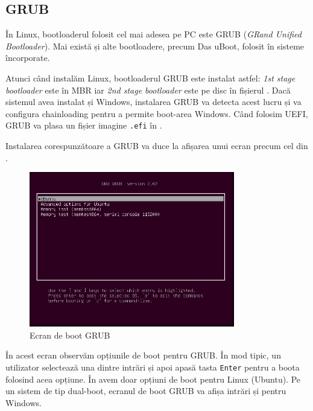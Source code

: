 \subsection{GRUB}
\label{sec:boot:bootloader:grub}

În Linux, bootloaderul folosit cel mai adesea pe PC este GRUB (\textit{GRand Unified
Bootloader}). Mai există și alte bootloadere, precum Das uBoot, folosit în
sisteme încorporate.

Atunci când instalăm Linux, bootloaderul GRUB este instalat astfel: \textit{1st
stage bootloader} este în MBR iar \textit{2nd stage bootloader} este pe disc în fișierul
. Dacă sistemul avea instalat și Windows, instalarea GRUB va
detecta acest lucru și va configura chainloading pentru a permite boot-area
Windows. Când folosim UEFI, GRUB va plasa un fișier imagine \texttt{.efi} în
.

Instalarea corespunzătoare a GRUB va duce la afișarea unui ecran precum cel din .

\begin{figure}[!htbp]
  \centering
  \includegraphics[width=0.8\textwidth]{chapters/09-boot/img/boot-grub.png}
  \caption{Ecran de boot GRUB}
  \label{fig:boot:boot-grub}
\end{figure}

În acest ecran observăm opțiunile de boot pentru GRUB. În mod tipic, un
utilizator selectează una dintre intrări și apoi apasă tasta \texttt{Enter} pentru a
boota folosind acea opțiune. În  avem doar opțiuni de boot pentru Linux (Ubuntu). Pe un sistem de tip dual-boot, ecranul de boot GRUB va afișa intrări și pentru Windows.


